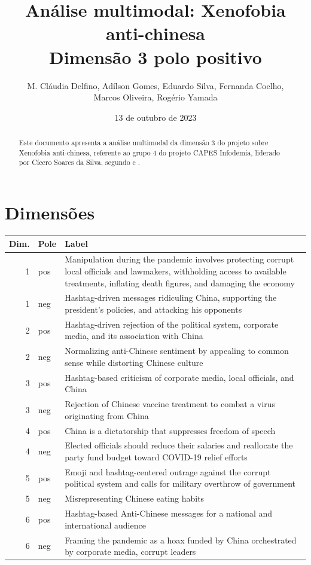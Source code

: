 \documentclass[aspectratio=169]{article}
\title{Análise multimodal: Xenofobia anti-chinesa\\Dimensão 3 polo positivo}
\author{M. Cláudia Delfino, Adílson Gomes, Eduardo Silva, Fernanda Coelho, \\ Marcos Oliveira, Rogério Yamada}
\date{13 de outubro de 2023}
\begin{document}
\maketitle

\begin{abstract}
Este documento apresenta a análise multimodal da dimensão 3 do projeto sobre Xenofobia anti-chinesa, referente ao grupo 4 do projeto CAPES Infodemia, liderado por Cícero Soares da Silva, segundo  e .
\end{abstract}

\section{Dimensões}

\begin{table}[H]
\begin{tabular}{r l  p{}} \hline
Dim.&Pole& Label \\ \hline
1&pos&Manipulation during the pandemic involves protecting corrupt local officials and lawmakers, withholding access to available treatments, inflating death figures, and damaging the economy \\
1&neg&Hashtag-driven messages ridiculing China, supporting the president's policies, and attacking his opponents \\ \hline
2&pos&Hashtag-driven rejection of the political system, corporate media, and its association with China \\
2&neg&Normalizing anti-Chinese sentiment by appealing to common sense while distorting Chinese culture \\  \hline
3&pos&Hashtag-based criticism of corporate media, local officials, and China \\
3&neg&Rejection of Chinese vaccine treatment to combat a virus originating from China \\  \hline
4&pos&China is a dictatorship that suppresses freedom of speech  \\
4&neg&Elected officials should reduce their salaries and reallocate the party fund budget toward COVID-19 relief efforts \\  \hline
5&pos&Emoji and hashtag-centered outrage against the corrupt political system and calls for military overthrow of government  \\
5&neg&Misrepresenting Chinese eating habits \\  \hline
6&pos&Hashtag-based Anti-Chinese messages for a national and international audience  \\
6&neg&Framing the pandemic as a hoax funded by China orchestrated by corporate media, corrupt leaders \\
\hline
\end{tabular}
\end{table}
\end{document}

